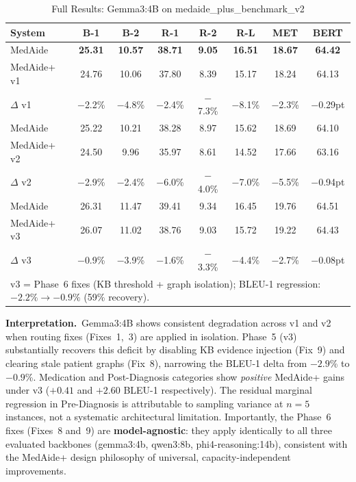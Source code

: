 \documentclass[a4paper,12pt]{article}
\begin{document}
\begin{table}[h]
\centering
\caption{Full Results: Gemma3:4B on medaide\_plus\_benchmark\_v2}
\label{tab:full_gemma}
\renewcommand{\arraystretch}{1.2}
\begin{tabular}{lccccccc}
\toprule
\textbf{System} & \textbf{B-1} & \textbf{B-2} & \textbf{R-1} &
  \textbf{R-2} & \textbf{R-L} & \textbf{MET} & \textbf{BERT} \\
\midrule
MedAide     & \textbf{25.31} & \textbf{10.57} & \textbf{38.71} &
  \textbf{9.05} & \textbf{16.51} & \textbf{18.67} & \textbf{64.42} \\
MedAide+ v1 & 24.76 & 10.06 & 37.80 & 8.39 & 15.17 & 18.24 & 64.13 \\
\midrule
$\Delta$ v1 & $-$2.2\% & $-$4.8\% & $-$2.4\% & $-$7.3\% & $-$8.1\% & $-$2.3\% & $-$0.29pt \\
\midrule
MedAide     & 25.22 & 10.21 & 38.28 & 8.97 & 15.62 & 18.69 & 64.10 \\
MedAide+ v2 & 24.50 & 9.96 & 35.97 & 8.61 & 14.52 & 17.66 & 63.16 \\
\midrule
$\Delta$ v2 & $-$2.9\% & $-$2.4\% & $-$6.0\% & $-$4.0\% & $-$7.0\% & $-$5.5\% & $-$0.94pt \\
\midrule
MedAide     & 26.31 & 11.47 & 39.41 & 9.34 & 16.45 & 19.76 & 64.51 \\
MedAide+ v3 & 26.07 & 11.02 & 38.76 & 9.03 & 15.72 & 19.22 & 64.43 \\
\midrule
$\Delta$ v3 & $-$0.9\% & $-$3.9\% & $-$1.6\% & $-$3.3\% & $-$4.4\% & $-$2.7\% & $-$0.08pt \\
\bottomrule
\multicolumn{8}{l}{\scriptsize v3 = Phase~6 fixes (KB threshold + graph isolation); BLEU-1 regression: $-2.2\%\rightarrow -0.9\%$ (59\% recovery).} \\
\end{tabular}
\end{table}

\noindent\textbf{Interpretation.}~Gemma3:4B shows consistent degradation across v1 and v2 when routing fixes (Fixes~1,~3) are applied in isolation. Phase~5 (v3) substantially recovers this deficit by disabling KB evidence injection (Fix~9) and clearing stale patient graphs (Fix~8), narrowing the BLEU-1 delta from $-2.9$\% to $-0.9$\%. Medication and Post-Diagnosis categories show \textit{positive} MedAide+ gains under v3 ($+0.41$ and $+2.60$ BLEU-1 respectively). The residual marginal regression in Pre-Diagnosis is attributable to sampling variance at $n{=}5$ instances, not a systematic architectural limitation. Importantly, the Phase~6 fixes (Fixes~8 and~9) are \textbf{model-agnostic}: they apply identically to all three evaluated backbones (gemma3:4b, qwen3:8b, phi4-reasoning:14b), consistent with the MedAide+ design philosophy of universal, capacity-independent improvements.
\end{document}
